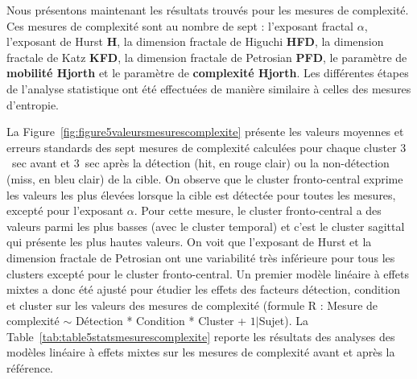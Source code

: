 Nous présentons maintenant les résultats trouvés pour les mesures de complexité. 
Ces mesures de complexité sont au nombre de sept : l'exposant fractal $\alpha$, l'exposant de Hurst \textbf{H}, la dimension fractale de Higuchi \textbf{HFD}, la dimension fractale de Katz \textbf{KFD}, la dimension fractale de Petrosian \textbf{PFD}, le paramètre de \textbf{mobilité Hjorth} et le paramètre de \textbf{complexité Hjorth}. 
Les différentes étapes de l'analyse statistique ont été effectuées de manière similaire à celles des mesures d'entropie.

La Figure~\ref{fig:figure5valeursmesurescomplexite} présente les valeurs moyennes et erreurs standards des sept mesures de complexité calculées pour chaque cluster $3$~sec avant et $3$~sec après la détection (hit, en rouge clair) ou la non-détection (miss, en bleu clair) de la cible. 
On observe que le cluster fronto-central exprime les valeurs les plus élevées lorsque la cible est détectée pour toutes les mesures, excepté pour l'exposant $\alpha$. 
Pour cette mesure, le cluster fronto-central a des valeurs parmi les plus basses (avec le cluster temporal) et c'est le cluster sagittal qui présente les plus hautes valeurs. 
On voit que l'exposant de Hurst et la dimension fractale de Petrosian ont une variabilité très inférieure pour tous les clusters excepté pour le cluster fronto-central. 
Un premier modèle linéaire à effets mixtes a donc été ajusté pour étudier les effets des facteurs détection, condition et cluster sur les valeurs des mesures de complexité (formule R : Mesure de complexité $\sim$ Détection * Condition * Cluster + $1|$Sujet). 
La Table~\ref{tab:table5statsmesurescomplexite} reporte les résultats des analyses des modèles linéaire à effets mixtes sur les mesures de complexité avant et après la référence. \\

